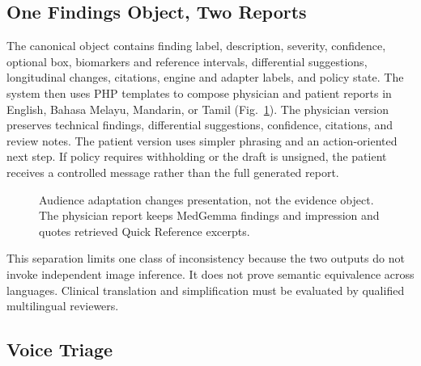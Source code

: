 \documentclass[conference]{IEEEtran}
\begin{document}
\subsection{One Findings Object, Two Reports}

The canonical object contains finding label, description, severity, confidence, optional box, biomarkers and reference intervals, differential suggestions, longitudinal changes, citations, engine and adapter labels, and policy state. The system then uses PHP templates to compose physician and patient reports in English, Bahasa Melayu, Mandarin, or Tamil (Fig.~\ref{fig:dualreport}). The physician version preserves technical findings, differential suggestions, confidence, citations, and review notes. The patient version uses simpler phrasing and an action-oriented next step. If policy requires withholding or the draft is unsigned, the patient receives a controlled message rather than the full generated report.

\begin{figure}[t]
\centering
{}
\caption{Audience adaptation changes presentation, not the evidence object. The physician report keeps MedGemma findings and impression and quotes retrieved Quick Reference excerpts.}
\label{fig:dualreport}
\end{figure}

This separation limits one class of inconsistency because the two outputs do not invoke independent image inference. It does not prove semantic equivalence across languages. Clinical translation and simplification must be evaluated by qualified multilingual reviewers.

\subsection{Voice Triage}
\end{document}
